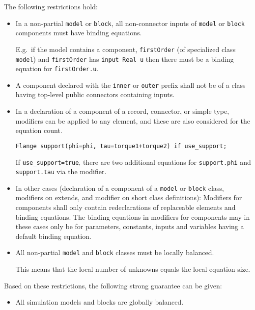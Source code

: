 The following restrictions hold:
\begin{itemize}
\item
  In a non-partial \lstinline!model! or \lstinline!block!, all non-connector inputs of \lstinline!model! or \lstinline!block! components must have binding equations.
  \begin{nonnormative}
  E.g.\ if the model contains a component, \lstinline!firstOrder! (of specialized class \lstinline!model!) and \lstinline!firstOrder! has
  \lstinline!input Real u! then there must be a binding equation for \lstinline!firstOrder.u!.
  \end{nonnormative}
\item
  A component declared with the \lstinline!inner! or \lstinline!outer! prefix shall not be of a
  class having top-level public connectors containing inputs.
\item
  In a declaration of a component of a record, connector, or simple type, modifiers can be applied to any element, and these are also considered for the equation count.
\begin{example}
\begin{lstlisting}[language=modelica]
Flange support(phi=phi, tau=torque1+torque2) if use_support;
\end{lstlisting}
  If \lstinline!use_support=true!, there are two additional equations for \lstinline!support.phi! and \lstinline!support.tau! via the modifier.
\end{example}
\item
  In other cases (declaration of a component of a \lstinline!model! or \lstinline!block! class, modifiers on extends, and modifier on short class definitions):  Modifiers for components shall only contain redeclarations of replaceable elements and binding equations.  The binding equations in modifiers for components may in these cases only be for parameters, constants, inputs and variables having a default binding equation.
\item
  All non-partial \lstinline!model! and \lstinline!block! classes must be locally balanced.
  \begin{nonnormative}
  This means that the local number of unknowns equals the local equation size.
  \end{nonnormative}
\end{itemize}

Based on these restrictions, the following strong guarantee can be given:
\begin{itemize}
\item All simulation models and blocks are globally balanced.
\end{itemize}

